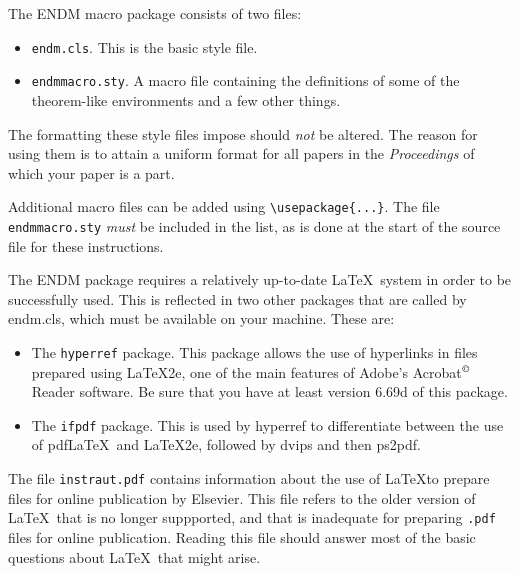 The ENDM macro package consists of two files:
\begin{itemize}
\item \texttt{endm.cls}. This is the basic style file.
\item \texttt{endmmacro.sty}. A macro file containing the definitions
of some of the theorem-like environments and a few other things.
\end{itemize}

The formatting these style files impose should \emph{not} be altered.
The reason for using them is to attain a uniform format for all papers
in the \emph{Proceedings} of which your paper is a part.

Additional macro files can be added using \verb+\usepackage{...}+.
The file \texttt{endmmacro.sty} \emph{must} be included in the
list, as is done at the start of the source file for these
instructions.

The ENDM package requires a relatively up-to-date \LaTeX\ system in
order to be successfully used. This is reflected in two other packages
that are called by endm.cls, which must be available on your machine.
These are:
\begin{itemize}
\item The \texttt{hyperref} package. This package allows the use of
hyperlinks in files prepared using \LaTeX 2e, one of the main features
of Adobe's Acrobat$^{\copyright}$ Reader software. Be sure that you
have at least version 6.69d of this package.
\item The \texttt{ifpdf} package. This is used by hyperref to
differentiate between the use of pdf\LaTeX\ and \LaTeX 2e, followed
by dvips and then ps2pdf.
\end{itemize}

The file \texttt{instraut.pdf} contains information about the use of
\LaTeX to prepare files for online publication by Elsevier. This file
refers to the older version of \LaTeX\ that is no longer suppported,
and that is inadequate for preparing \texttt{.pdf} files for online
publication. Reading this file should answer most of the basic
questions about \LaTeX\ that might arise.
